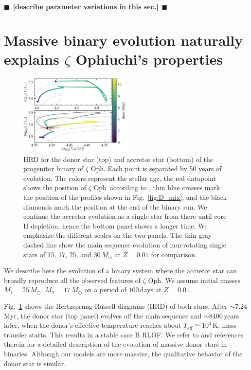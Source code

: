 \documentclass[twocolumn,twocolappendix,trackchanges]{aastex63}
\DeclareRobustCommand{\Figref}[1]{Fig.~\ref{#1}}
\newcommand{\zoph}{$\zeta$ Oph}
\newcommand{\todo}[1]{{\large $\blacksquare$~\textbf{\color{red}[#1]}}~$\blacksquare$}
\begin{document}
\todo{describe parameter variations in this sec.}

\section{Massive binary evolution naturally explains $\zeta$
  Ophiuchi's properties}
\label{sec:best_model}

\begin{figure}[tbp]
  \includegraphics[width=0.5\textwidth]{HRD_both}
  \caption{HRD for the donor star (top) and accretor star (bottom) of
    the progenitor binary of \zoph. Each point is separated by 50
    years of evolution. The colors represent the
    stellar age, the red datapoint shows the position of \zoph\
    according to , thin blue crosses mark the
    position of the profiles shown in \Figref{fig:D_mix}, and the black diamonds mark the
    position at the end of the binary run. We continue the accretor
    evolution as a single star from there until core H depletion,
    hence the bottom panel shows a longer time. We emphasize the different
    scales on the two panels. The thin gray dashed line show the main
    sequence evolution of non-rotating single stars of 15, 17, 25, and
    30\,$M_\odot$ at $Z=0.01$ for comparison.}
  \label{fig:HRD_both}
\end{figure}


We describe here the evolution of a binary system where the accretor
star can broadly reproduce all the observed features of \zoph. We assume initial masses
$M_1=25\,M_\odot$, $M_2=17\,M_\odot$ on a period of $100$\,days at
$Z=0.01$.

\Figref{fig:HRD_both} shows the Hertzsprung-Russell diagrams (HRD)
of both stars. After $\sim$$7.24$\,Myr, the donor star (top panel) evolves off the main
sequence and $\sim8400$\,years later, when the donor's effective
temperature reaches about $T_\mathrm{eff}\simeq 10^4$\,K, mass transfer starts. This
results in a stable case B RLOF. We refer to \cite{gotberg:17, laplace:21, blagorodnova:21}
and references therein for a detailed description of the evolution of
massive donor stars in binaries. Although our models are
more massive, the qualitative behavior of the donor star is similar.
\end{document}

